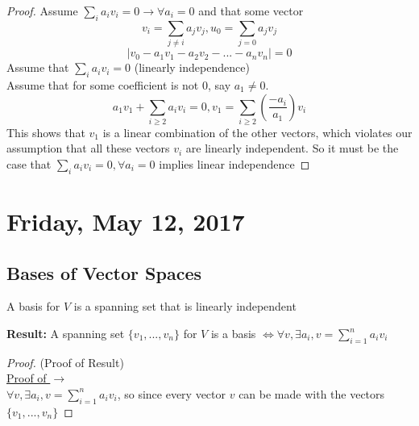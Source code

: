 \documentclass[12pt]{article}
\begin{document}
\begin{proof}
	Assume $\sum_i a_i v_i = 0 \longrightarrow \forall a_i = 0$ and that some vector
	$$v_i = \sum_{j \neq i} a_j v_j, u_0 = \sum_{j = 0} a_j v_j$$
	$$|v_0 - a_1 v_1 - a_2 v_2 - ... - a_n v_n| = 0$$
	Assume that $\sum_i a_i v_i = 0$ (linearly independence)\\
	Assume that for some coefficient is not 0, say $a_1 \neq 0$.\\
	$$a_1 v_1 + \sum_{i\geq 2} a_i v_i = 0, v_1 = \sum_{i\geq 2} (\frac{-a_i}{a_1}) v_i$$
	This shows that $v_1$ is a linear combination of the other vectors, which violates our assumption that all these vectors $v_i$ are linearly independent. So it must be the case that $\sum_i a_i v_i = 0, \forall a_i = 0$ implies linear independence
\end{proof}

\newpage

\section{Friday, May 12, 2017}

\subsection{Bases of Vector Spaces}

\begin{tcolorbox}[title=Definition: A Basis of Vector Spaces]
	A basis for $V$ is a spanning set that is linearly independent
\end{tcolorbox}

\textbf{Result:} A spanning set $\{v_1, ..., v_n \}$ for $V$ is a basis $\Longleftrightarrow \forall v, \exists a_i, v = \sum^n_{i = 1} a_i v_i$

\begin{proof}(Proof of Result)\\
	\underline{Proof of $\longrightarrow$}\\
	$\forall v, \exists a_i, v = \sum^n_{i = 1} a_i v_i$, so since every vector $v$ can be made with the vectors $\{v_1, ..., v_n \}$
\end{proof}
\end{document}

